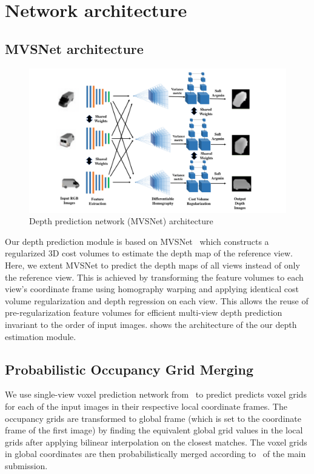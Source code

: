 \section*{Network architecture}
\subsection*{MVSNet architecture}
\label{subsec:mvsnet}

\begin{figure}[ht]
    \begin{center}
        \includegraphics[width=\linewidth]{imgs/MVSNet_architecture.png}
    \end{center}
    \vspace{-4mm}
        \caption{Depth prediction network (MVSNet) architecture}
        \vspace{-4mm}
        \label{fig:mvsnet_architecture}
\end{figure}

Our depth prediction module is based on MVSNet~\cite{yao2018mvsnet} which constructs a regularized 3D cost volumes
to estimate the depth map of the reference view.
Here, we extent MVSNet to predict the depth maps of all views instead of only the reference view.
This is achieved by transforming the feature volumes to each view's coordinate frame using homography warping
and applying identical cost volume regularization and depth regression on each view.
This allows the reuse of pre-regularization feature volumes for efficient multi-view depth prediction invariant to the order of input images.
 shows the architecture of the our depth estimation module.

\subsection*{Probabilistic Occupancy Grid Merging}
We use single-view voxel prediction network from~\cite{gkioxari2019meshrcnn} to predict predicts voxel grids for each of the input images in their respective local coordinate frames.
The occupancy grids are transformed to global frame (which is set to the coordinate frame of the first image)
by finding the equivalent global grid values in the local grids after applying bilinear interpolation on the closest matches.
The voxel grids in global coordinates are then probabilistically merged according to~ of the main submission.

